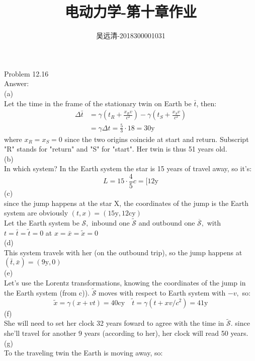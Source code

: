 \documentclass[UTF8]{ctexart}
\title{电动力学-第十章作业}
\author{吴远清-2018300001031}
\begin{document}
	\maketitle
	Problem 12.16\\
	Answer:\\
	(a)\\
	Let the time in the frame of the stationary twin on Earth be $\bar{t}$, then:\\
	$$\begin{aligned}
		\Delta \bar{t} &=\gamma\left(t_{R}+\frac{x_{R} v}{c^{2}}\right)-\gamma\left(t_{S}+\frac{x_{S} v}{c^{2}}\right) \\
		&=\gamma \Delta t=\frac{5}{3} \cdot 18=30 \mathrm{y}
	\end{aligned}$$
	where $x_{R}=x_{S}=0$ since the two origins coincide at start and return. Subscript "R" stands for "return" and "S" for "start". Her twin is thus 51 years old.\\
	(b)\\
	In which system? In the Earth system the star is 15 years of travel away, so it's:
	$$L=15 \cdot \frac{4}{5} c=[12 \mathrm{y}$$
	(c)\\
	since the jump happens at the star $\mathrm{X}$, the coordinates of the jump is the Earth system are obviously $(t, x)=(15 \mathrm{y}, 12 \mathrm{cy})$\\
	Let the Earth system be $\mathcal{S},$ inbound one $\tilde{\mathcal{S}}$ and outbound one $\overline{\mathcal{S}},$ with $t=\bar{t}=\tilde{t}=0$ at $x=\bar{x}=\tilde{x}=0$\\
	(d)\\
	This system travels with her (on the outbound trip), so the jump happens at $(\bar{t}, \bar{x})=(9 \mathrm{y}, 0)$\\
	(e)\\
	Let's use the Lorentz transformations, knowing the coordinates of the jump in the Earth system (from c)). $\tilde{\mathcal{S}}$ moves with respect to Earth system with $-v,$ so:\\
	$$\tilde{x}=\gamma(x+v t)=40 \mathrm{cy} \quad \tilde{t}=\gamma\left(t+x v / c^{2}\right)=41 \mathrm{y}$$
	(f)\\
	She will need to set her clock 32 years foward to agree with the time in $\tilde{\mathcal{S}} .$ since she'll travel for another 9 years (according to her), her clock will read 50 years.\\
	(g)\\
	To the traveling twin the Earth is moving away, so:\\
\end{document}
